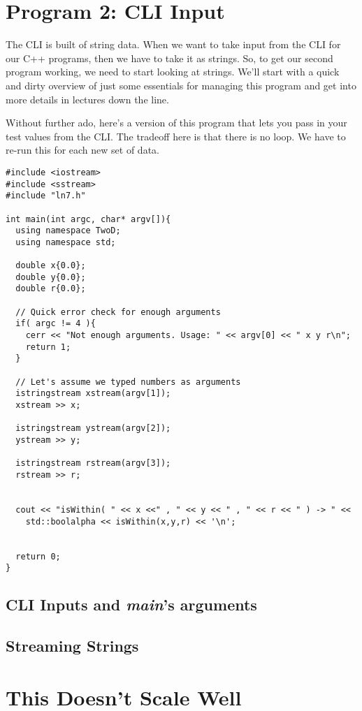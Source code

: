\documentclass[]{tufte-handout}
\begin{document}
\section{Program 2: CLI Input}

The CLI is built of string data.  When we want to take input from the CLI for our C++ programs, then we have to take it as strings.  So, to get our second program working, we need to start looking at strings. We'll start with a quick and dirty overview of just some essentials for managing this program and get into more details in lectures down the line.

Without further ado, here's a version of this program that lets you pass in your test values from the CLI. The tradeoff here is that there is no loop. We have to re-run this for each new set of data.
\begin{verbatim}
#include <iostream>
#include <sstream>
#include "ln7.h"

int main(int argc, char* argv[]){
  using namespace TwoD;
  using namespace std;

  double x{0.0};
  double y{0.0};
  double r{0.0};

  // Quick error check for enough arguments
  if( argc != 4 ){
    cerr << "Not enough arguments. Usage: " << argv[0] << " x y r\n";
    return 1;
  }

  // Let's assume we typed numbers as arguments
  istringstream xstream(argv[1]);
  xstream >> x;

  istringstream ystream(argv[2]);
  ystream >> y;

  istringstream rstream(argv[3]);
  rstream >> r;


  cout << "isWithin( " << x <<" , " << y << " , " << r << " ) -> " <<
    std::boolalpha << isWithin(x,y,r) << '\n';


  return 0;
}

\end{verbatim}

\subsection{CLI Inputs and \textit{main}'s arguments}

\subsection{Streaming Strings}

\section{This Doesn't Scale Well}
\end{document}
